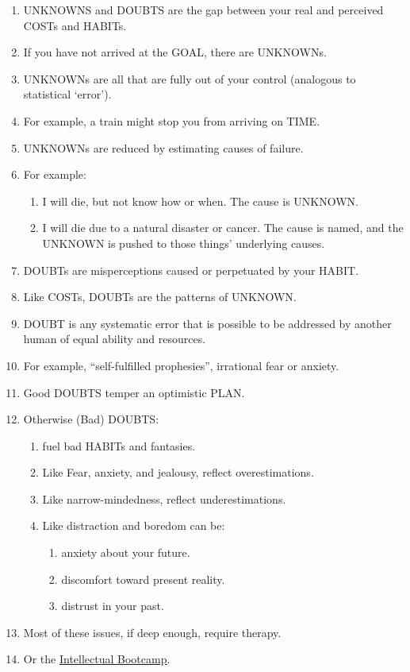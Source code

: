 \documentclass[
]{book}
\providecommand{\tightlist}{%
  \setlength{\itemsep}{0pt}\setlength{\parskip}{0pt}}
\begin{document}
\begin{enumerate}
\def\labelenumi{\arabic{enumi}.}
\setcounter{enumi}{49}
\item
  UNKNOWNS and DOUBTS are the gap between your real and perceived COSTs and HABITs.\\
\item
  If you have not arrived at the GOAL, there are UNKNOWNs.
\item
  UNKNOWNs are all that are fully out of your control (analogous to statistical `error').
\item
  For example, a train might stop you from arriving on TIME.
\item
  UNKNOWNs are reduced by estimating causes of failure.
\item
  For example:

  \begin{enumerate}
  \def\labelenumii{\arabic{enumii}.}
  \tightlist
  \item
    I will die, but not know how or when. The cause is UNKNOWN.
  \item
    I will die due to a natural disaster or cancer. The cause is named, and the UNKNOWN is pushed to those things' underlying causes.
  \end{enumerate}
\item
  DOUBTs are misperceptions caused or perpetuated by your HABIT.
\item
  Like COSTs, DOUBTs are the patterns of UNKNOWN.
\item
  DOUBT is any systematic error that is possible to be addressed by another human of equal ability and resources.
\item
  For example, ``self-fulfilled prophesies'', irrational fear or anxiety.
\item
  Good DOUBTS temper an optimistic PLAN.
\item
  Otherwise (Bad) DOUBTS:

  \begin{enumerate}
  \def\labelenumii{\arabic{enumii}.}
  \tightlist
  \item
    fuel bad HABITs and fantasies.
  \item
    Like Fear, anxiety, and jealousy, reflect overestimations.
  \item
    Like narrow-mindedness, reflect underestimations.
  \item
    Like distraction and boredom can be:

    \begin{enumerate}
    \def\labelenumiii{\arabic{enumiii}.}
    \tightlist
    \item
      anxiety about your future.
    \item
      discomfort toward present reality.
    \item
      distrust in your past.
    \end{enumerate}
  \end{enumerate}
\item
  Most of these issues, if deep enough, require therapy.
\item
  Or the \protect\hyperlink{intellectual-bootcamp}{Intellectual Bootcamp}.
\end{enumerate}
\end{document}
